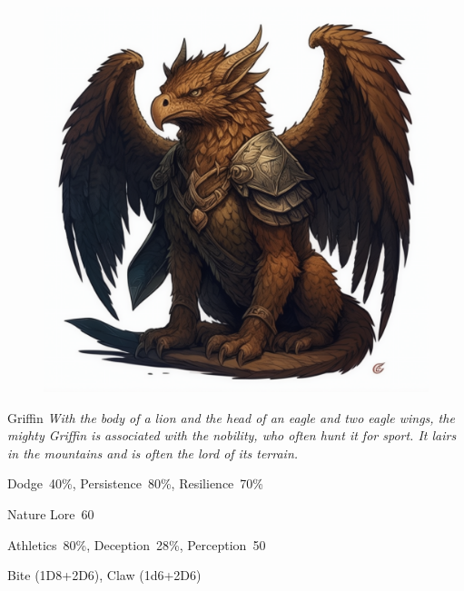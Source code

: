 

\begin{figure}[h]
\begin{center}
\includegraphics[scale=0.24]{img/ai-images/griffin.png}
\end{center}
\end{figure}
\begin{monsterbox}{Griffin}
	\textit{With the body of a lion and the head of an eagle and two eagle wings, the mighty Griffin is associated with the nobility, who often hunt it for sport. It lairs in the mountains and is often the lord of its terrain.}\\
	\rpghline
	\basics[%
        hitpoints  = 25,
	majorwound = 13,
	damagemodifier = +2D6,
	powerpoints = 13,
	movementrate = {23m, 30m when flying},
	armor = Tough Hide (3AP),
	plunderrating = 0
	]
	\rpghline%
	\stats[ %
		STR = 8D6    (28),
		CON = 3D6+12 (22),
		DEX = 3D6+12 (22),
		SIZ = 8D6    (28),
		INT = 6      (6),
		POW = 2D6+6  (13),
		CHA = 7      (7)
	]
	\rpghline%
	\begin{rpg-monsteraction}[Resistances]
		Dodge~40\%, Persistence~80\%, Resilience~70\%
	\end{rpg-monsteraction}
	\begin{rpg-monsteraction}[Knowledge]
		Nature Lore~60%
	\end{rpg-monsteraction}
	\begin{rpg-monsteraction}[Practical]
		Athletics~80\%, Deception~28\%, Perception~50%
	\end{rpg-monsteraction}
	\begin{rpg-monsteraction}
		Bite (1D8+2D6), Claw (1d6+2D6)
	\end{rpg-monsteraction}
\end{monsterbox}

